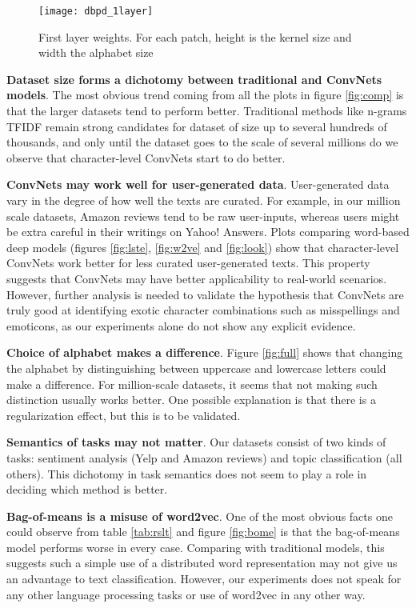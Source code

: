 \documentclass{article} \usepackage{nips15submit_e,times}
\begin{document}
\begin{figure}[ht]
  \begin{center}
    \texttt{[image: dbpd\_1layer]}
  \end{center}
  \caption{First layer weights. For each patch, height is the kernel size and width the alphabet size}
  \label{fig:weig}
\end{figure}

\textbf{Dataset size forms a dichotomy between traditional and ConvNets models}. The most obvious trend coming from all the plots in figure \ref{fig:comp} is that the larger datasets tend to perform better. Traditional methods like n-grams TFIDF remain strong candidates for dataset of size up to several hundreds of thousands, and only until the dataset goes to the scale of several millions do we observe that character-level ConvNets start to do better.

\textbf{ConvNets may work well for user-generated data}. User-generated data vary in the degree of how well the texts are curated. For example, in our million scale datasets, Amazon reviews tend to be raw user-inputs, whereas users might be extra careful in their writings on Yahoo! Answers. Plots comparing word-based deep models (figures \ref{fig:lste}, \ref{fig:w2ve} and \ref{fig:look}) show that character-level ConvNets work better for less curated user-generated texts. This property suggests that ConvNets may have better applicability to real-world scenarios. However, further analysis is needed to validate the hypothesis that ConvNets are truly good at identifying exotic character combinations such as misspellings and emoticons, as our experiments alone do not show any explicit evidence.

\textbf{Choice of alphabet makes a difference}. Figure \ref{fig:full} shows that changing the alphabet by distinguishing between uppercase and lowercase letters could make a difference. For million-scale datasets, it seems that not making such distinction usually works better. One possible explanation is that there is a regularization effect, but this is to be validated.

\textbf{Semantics of tasks may not matter}. Our datasets consist of two kinds of tasks: sentiment analysis (Yelp and Amazon reviews) and topic classification (all others). This dichotomy in task semantics does not seem to play a role in deciding which method is better.

\textbf{Bag-of-means is a misuse of word2vec}\cite{LKW15}. One of the most obvious facts one could observe from table \ref{tab:rslt} and figure \ref{fig:bome} is that the bag-of-means model performs worse in every case. Comparing with traditional models, this suggests such a simple use of a distributed word representation may not give us an advantage to text classification. However, our experiments does not speak for any other language processing tasks or use of word2vec in any other way.
\end{document}
